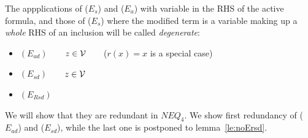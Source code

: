 \noindent
The appplications of ($E_s$) and ($E_a$) with variable in the RHS
of the active formula, and those of ($E_s$) where the modified term is 
a variable making up a {\em whole} RHS of an inclusion will be called {\em degenerate}:
\begin{itemize}\MyLPar
\item $(E_{ad})$\ \ \ \
 $z\in{\cal V}$\ \ \ \ ($r(x)=x$ is a special case)
\item $(E_{sd})$\ \ \ \
 $z\in{\cal V}$
\item $(E_{Rsd})$\ \ 
\end{itemize}
We will show that they are redundant in $NEQ_4$. We show first redundancy
of ($E_{ad}$) and ($E_{sd}$), while the last one is postponed to lemma~\ref{le:noErsd}.

